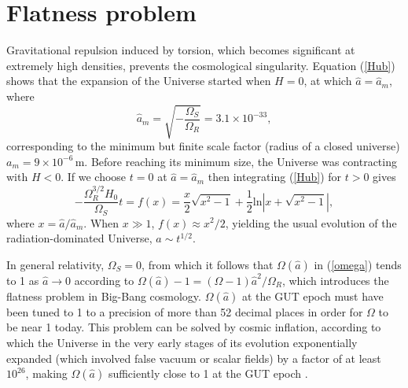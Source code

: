 \documentclass[prd,onecolumn,nofootinbib,showkeys]{revtex4}
\begin{document}
\section{Flatness problem}
Gravitational repulsion induced by torsion, which becomes significant at extremely high densities, prevents the cosmological singularity.
Equation (\ref{Hub}) shows that the expansion of the Universe started when $H=0$, at which $\hat{a}=\hat{a}_m$, where
\begin{equation}
\hat{a}_m=\sqrt{-\frac{\Omega_S}{\Omega_R}}=3.1\times10^{-33},
\label{mini}
\end{equation}
corresponding to the minimum but finite scale factor (radius of a closed universe) $a_m=9\times10^{-6}\,\mbox{m}$.
Before reaching its minimum size, the Universe was contracting with $H<0$.
If we choose $t=0$ at $\hat{a}=\hat{a}_m$ then integrating (\ref{Hub}) for $t>0$ gives
\begin{equation}
-\frac{\Omega^{3/2}_R H_0}{\Omega_S}t=f(x)=\frac{x}{2}\sqrt{x^2-1}+\frac{1}{2}\mbox{ln}|x+\sqrt{x^2-1}|,
\end{equation}
where $x=\hat{a}/\hat{a}_m$.
When $x\gg1$, $f(x)\approx x^2/2$, yielding the usual evolution of the radiation-dominated Universe, $a\sim t^{1/2}$.

In general relativity, $\Omega_S=0$, from which it follows that $\Omega(\hat{a})$ in (\ref{omega}) tends to 1 as $\hat{a}\rightarrow 0$ according to $\Omega(\hat{a})-1=(\Omega-1)\hat{a}^2/\Omega_R$, which introduces the flatness problem in Big-Bang cosmology.
$\Omega(\hat{a})$ at the GUT epoch must have been tuned to 1 to a precision of more than 52 decimal places in order for $\Omega$ to be near 1 today.
This problem can be solved by cosmic inflation, according to which the Universe in the very early stages of its evolution exponentially expanded (which involved false vacuum or scalar fields) by a factor of at least $10^{26}$, making $\Omega(\hat{a})$ sufficiently close to 1 at the GUT epoch \cite{inf1,inf2}.
\end{document}
